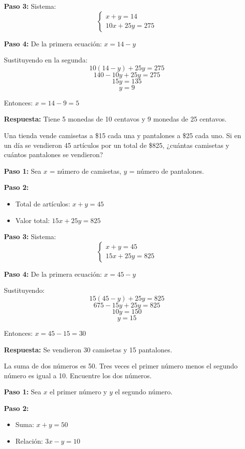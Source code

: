 \begin{exercise}
\begin{solucion}
\textbf{Paso 3:} Sistema:
$$\begin{cases}
x + y = 14 \\
10x + 25y = 275
\end{cases}$$

\textbf{Paso 4:} De la primera ecuación: $x = 14 - y$

Sustituyendo en la segunda:
$$10(14 - y) + 25y = 275$$
$$140 - 10y + 25y = 275$$
$$15y = 135$$
$$y = 9$$

Entonces: $x = 14 - 9 = 5$

\textbf{Respuesta:} Tiene 5 monedas de 10 centavos y 9 monedas de 25 centavos.
\end{solucion}

\problem Una tienda vende camisetas a \$15 cada una y pantalones a \$25 cada uno. Si en un día se vendieron 45 artículos por un total de \$825, ¿cuántas camisetas y cuántos pantalones se vendieron?

\begin{solucion}
\textbf{Paso 1:} Sea $x$ = número de camisetas, $y$ = número de pantalones.

\textbf{Paso 2:}
\begin{itemize}
    \item Total de artículos: $x + y = 45$
    \item Valor total: $15x + 25y = 825$
\end{itemize}

\textbf{Paso 3:} Sistema:
$$\begin{cases}
x + y = 45 \\
15x + 25y = 825
\end{cases}$$

\textbf{Paso 4:} De la primera ecuación: $x = 45 - y$

Sustituyendo:
$$15(45 - y) + 25y = 825$$
$$675 - 15y + 25y = 825$$
$$10y = 150$$
$$y = 15$$

Entonces: $x = 45 - 15 = 30$

\textbf{Respuesta:} Se vendieron 30 camisetas y 15 pantalones.
\end{solucion}

\problem La suma de dos números es 50. Tres veces el primer número menos el segundo número es igual a 10. Encuentre los dos números.

\begin{solucion}
\textbf{Paso 1:} Sea $x$ el primer número y $y$ el segundo número.

\textbf{Paso 2:}
\begin{itemize}
    \item Suma: $x + y = 50$
    \item Relación: $3x - y = 10$
\end{itemize}


\end{solucion}
\end{exercise}
